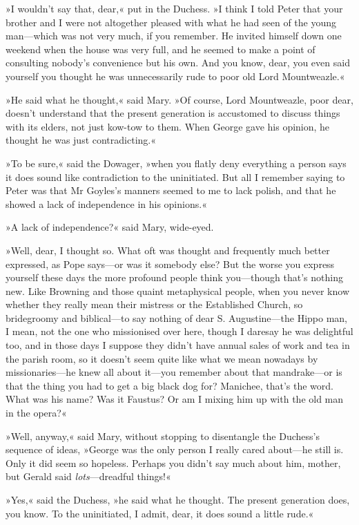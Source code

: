 »I wouldn't say that, dear,« put in the Duchess. »I think I told Peter that your brother and I were not altogether pleased with what he had seen of the young man—which was not very much, if you remember. He invited himself down one weekend when the house was very full, and he seemed to make a point of consulting nobody's convenience but his own. And you know, dear, you even said yourself you thought he was unnecessarily rude to poor old Lord Mountweazle.«

»He said what he thought,« said Mary. »Of course, Lord Mountweazle, poor dear, doesn't understand that the present generation is accustomed to discuss things with its elders, not just kow-tow to them. When George gave his opinion, he thought he was just contradicting.«

»To be sure,« said the Dowager, »when you flatly deny everything a person says it does sound like contradiction to the uninitiated. But all I remember saying to Peter was that Mr Goyles's manners seemed to me to lack polish, and that he showed a lack of independence in his opinions.«

»A lack of independence?« said Mary, wide-eyed.

»Well, dear, I thought so. What oft was thought and frequently much better expressed, as Pope says—or was it somebody else? But the worse you express yourself these days the more profound people think you—though that's nothing new. Like Browning and those quaint metaphysical people, when you never know whether they really mean their mistress or the Established Church, so bridegroomy and biblical—to say nothing of dear S. Augustine—the Hippo man, I mean, not the one who missionised over here, though I daresay he was delightful too, and in those days I suppose they didn't have annual sales of work and tea in the parish room, so it doesn't seem quite like what we mean nowadays by missionaries—he knew all about it—you remember about that mandrake—or is that the thing you had to get a big black dog for?  Manichee, that's the word. What was his name? Was it Faustus? Or am I mixing him up with the old man in the opera?«

»Well, anyway,« said Mary, without stopping to disentangle the Duchess's sequence of ideas, »George was the only person I really cared about—he still is. Only it did seem so hopeless. Perhaps you didn't say much about him, mother, but Gerald said \textit{lots}—dreadful things!«

»Yes,« said the Duchess, »he said what he thought. The present generation does, you know. To the uninitiated, I admit, dear, it does sound a little rude.«

